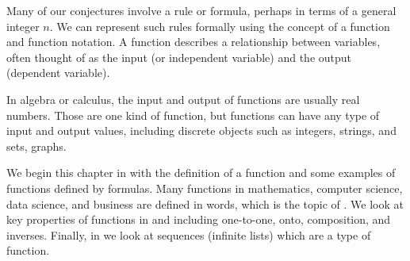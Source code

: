 Many of our conjectures involve a rule or formula, perhaps in terms of a general integer $n$. We can represent such rules formally using the concept of a function and function notation. A function describes a relationship between variables, often thought of as the input (or independent variable) and the output (dependent variable).  

In algebra or calculus, the input and output of functions are usually real numbers.  Those are one kind of function, but functions can have any type of input and output values, including discrete objects such as integers, strings, and sets, graphs. 

We begin this chapter in  {\secfunctions} with the definition of a function and some examples of functions defined by formulas.  Many functions in mathematics, computer science, data science, and business are defined in words, which is the topic of  {\secfnwords}. We look at key properties of functions in  {\seconetooneonto} and  {\secperms} including one-to-one, onto, composition, and inverses. Finally, in  {\secexplicitseq} we look at sequences (infinite lists) which are a type of function.

